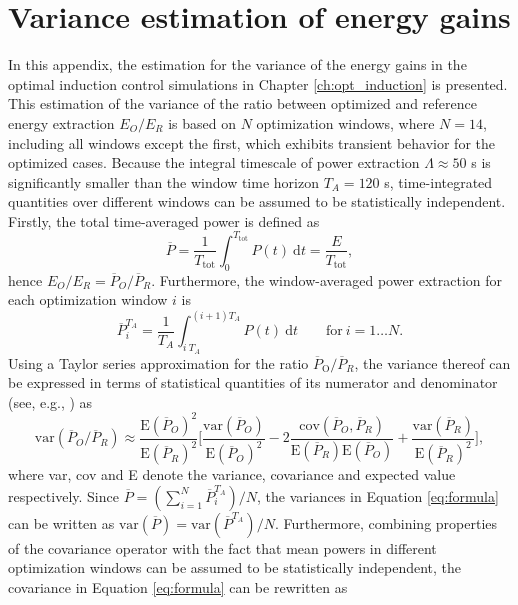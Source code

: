 \chapter{Variance estimation of energy gains}\label{ch:app_variance}

In this appendix, the estimation for the variance of the energy gains in the optimal induction control simulations in Chapter \ref{ch:opt_induction} is presented. 
This estimation of the variance of the ratio between optimized and reference energy extraction $E_O/E_R$ is based on $N$ optimization windows, where $N = 14$, including all windows except the first, which exhibits transient behavior for the optimized cases. Because the integral timescale of power extraction $\Lambda \approx 50$ s is significantly smaller than the window time horizon $T_A = 120$ s, time-integrated quantities over different windows can be assumed to be statistically independent. Firstly, the total time-averaged power is defined as 
\begin{equation}
\overline{P} = \frac{1}{T_\text{tot}} \int_{0}^{T_\text{tot}} P(t)~\text{d}t = \frac{E}{T_\text{tot}},
\end{equation}
hence $E_O/E_R = \overline{P}_O / \overline{P}_R$. Furthermore, the window-averaged power extraction for each optimization window $i$ is 
\begin{equation}
\overline{P}_{i}^{T_A} = \frac{1}{T_A} \int_{i\ T_A}^{(i+1)T_A} P(t)~\text{d}t \qquad \text{for}~i = 1 \dots N.
\end{equation}
\noindent Using a Taylor series approximation for the ratio $\overline{P}_{\text{O}} / \overline{P}_R$, the variance thereof can be expressed in terms of statistical quantities of its numerator and denominator (see, e.g., \citealp{kendalladvanced}) as 
\begin{equation}\label{eq:formula}
\text{var} (\overline{P}_O / \overline{P}_R) \approx \frac{\text{E}(\overline{P}_O)^2}{\text{E}(\overline{P}_R)^2} \bigg[ \frac{\text{var}(\overline{P}_O)}{\text{E}(\overline{P}_O)^2} - 2\frac{\text{cov}(\overline{P}_O, \overline{P}_R)}{\text{E}(\overline{P}_{R})\text{E}(\overline{P}_O)} + \frac{\text{var} (\overline{P}_R)}{\text{E}(\overline{P}_R)^2}  \bigg],
\end{equation}
\noindent where var, cov and E denote the variance, covariance and expected value respectively. Since $\overline{P} = (\sum_{i=1}^{N}\overline{P}_i^{T_A})/N$, the variances in Equation \eqref{eq:formula} can be written as $\text{var}(\overline{P}) = \text{var}(\overline{P}^{T_A})/N$. Furthermore, combining properties of the covariance operator with the fact that mean powers in different optimization windows can be assumed to be statistically independent, the covariance in Equation \eqref{eq:formula} can be rewritten as 
